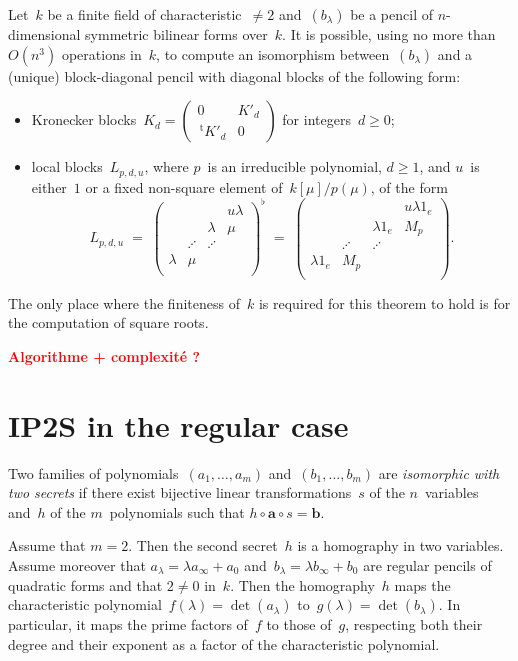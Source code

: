 \documentclass{lms}%
\def\transpose{\,{}^{\mathrm{t}\!}}
\def\mat#1{\begin{pmatrix}#1\end{pmatrix}}
\def\commentaire#1{{\bfseries\textcolor{red}{#1}}}
\begin{document}
\begin{thm}\label{thm:IP1S}
Let~$k$ be a finite field of characteristic~$≠2$ and~$(b_{λ})$ be a
pencil of $n$-dimensional symmetric bilinear forms over~$k$.
It is possible, using no more than~$O(n^3)$ operations in~$k$, to compute
an isomorphism between~$(b_{λ})$ and a (unique) block-diagonal pencil
with diagonal blocks of the following form:
\begin{itemize}
\item Kronecker blocks~$K_{d} = \mat{0&K'_{d}\\\transpose{K'_d}&0}$
for integers~$d ≥ 0$;
\item local blocks~$L_{p,d,u}$, where $p$~is an irreducible polynomial,
$d ≥ 1$, and $u$~is either~$1$ or a fixed non-square element
of~$k[μ]/p(μ)$, of the form
\[ L_{p,d,u} \;= \; \mat{ & & &uλ\\ & &λ&μ\\ &⋰&⋰& \\ λ&μ& & \\}^{♭} \;=\;
\mat{ & & &uλ1_e\\ & &λ1_e&M_p\\ &⋰&⋰& \\ λ1_e&M_p& & \\}. \]
\end{itemize}
\end{thm}

The only place where the finiteness of~$k$ is required for this theorem
to hold is for the computation of square roots.

\commentaire{Algorithme + complexité ?}

\section{IP2S in the regular case}%
\label{S:IP2S-regular}
Two families of polynomials~$(a_1,…,a_m)$ and~$(b_1,…,b_m)$ are
\emph{isomorphic with two secrets} if there exist bijective linear
transformations~$s$ of the $n$~variables and~$h$ of the $m$~polynomials
such that $h ∘ \bm{a} ∘ s = \bm{b}$.

Assume that $m = 2$. Then the second secret~$h$ is a homography in two
variables. Assume moreover that $a_{λ} = λ a_∞ + a_0$ and~$b_{λ} = λ
b_{∞} + b_0$ are regular pencils of quadratic forms and that $2≠ 0$
in~$k$. Then the homography~$h$ maps the characteristic polynomial~$f(λ)
= \det (a_{λ})$ to~$g(λ) = \det (b_{λ})$. In particular, it maps the
prime factors of~$f$ to those of~$g$, respecting both their degree and
their exponent as a factor of the characteristic polynomial.
\end{document}
